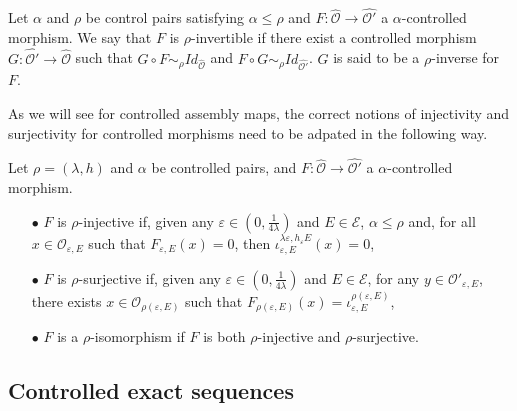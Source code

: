 \begin{definition}
Let $\alpha$ and $\rho$ be control pairs satisfying $\alpha \leq \rho$ and $F : \hat{\mathcal O} \rightarrow \hat{\mathcal O'}$ a $\alpha$-controlled morphism. We say that $F$ is $\rho$-invertible if there exist a controlled morphism $ G : \hat{\mathcal O'} \rightarrow \hat{\mathcal O}$ such that $G \circ F \sim_\rho Id_{\hat{\mathcal O}}$ and $F\circ G \sim_\rho Id_{\hat{\mathcal O'}}$. $G$ is said to be a $\rho$-inverse for $F$.
\end{definition}

As we will see for controlled assembly maps, the correct notions of injectivity and surjectivity for controlled morphisms need to be adpated in the following way.\\

\begin{definition}
Let $\rho=(\lambda,h)$ and $\alpha$ be controlled pairs, and $F : \hat{\mathcal O} \rightarrow \hat{\mathcal O'}$ a $\alpha$-controlled morphism. 
\begin{itemize}
\item[$\bullet$] $F$ is $\rho$-injective if, given any $\varepsilon \in (0,\frac{1}{4\lambda})$ and $E\in \mathcal E$, $\alpha\leq \rho$ and, for all $x\in \mathcal O_{\varepsilon, E}$ such that $F_{\varepsilon, E}(x)=0$, then $\iota_{\varepsilon, E}^{\lambda\varepsilon, h_\varepsilon E}(x)=0$,
\item[$\bullet$] $F$ is $\rho$-surjective if, given any $\varepsilon \in (0,\frac{1}{4\lambda})$ and $E\in \mathcal E$, for any $y\in \mathcal O' _{\varepsilon, E}$, there exists $x\in \mathcal O_{\rho(\varepsilon,E)}$ such that $F_{\rho(\varepsilon,E)}(x)= \iota_{\varepsilon,E}^{\rho(\varepsilon,E)}$,
\item[$\bullet$] $F$ is a $\rho$-isomorphism if $F$ is both $\rho$-injective and $\rho$-surjective.
\end{itemize}
\end{definition}

\subsection{Controlled exact sequences}

